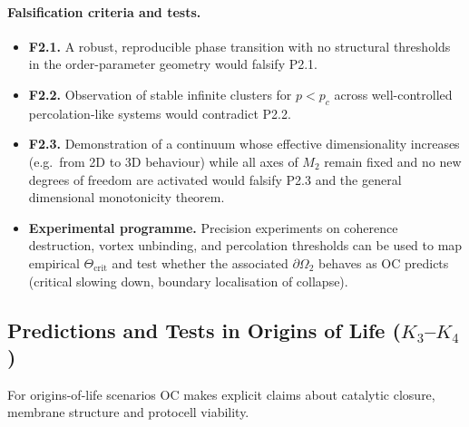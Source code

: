 \paragraph{Falsification criteria and tests.}
\begin{itemize}
  \item \textbf{F2.1.}
        A robust, reproducible phase transition with no structural
        thresholds in the order-parameter geometry would falsify P2.1.
  \item \textbf{F2.2.}
        Observation of stable infinite clusters for \(p<p_c\) across
        well-controlled percolation-like systems would contradict P2.2.
  \item \textbf{F2.3.}
        Demonstration of a continuum whose effective dimensionality increases
        (e.g.\ from 2D to 3D behaviour) while all axes of \(M_2\) remain
        fixed and no new degrees of freedom are activated would falsify
        P2.3 and the general dimensional monotonicity theorem.
  \item \textbf{Experimental programme.}
        Precision experiments on coherence destruction, vortex unbinding,
        and percolation thresholds can be used to map empirical
        \(\Theta_{\mathrm{crit}}\) and test whether the associated
        \(\partial\Omega_2\) behaves as OC predicts (critical slowing down,
        boundary localisation of collapse).
\end{itemize}

\subsection{Predictions and Tests in Origins of Life
            (\texorpdfstring{$K_3$}{K\_3}--\texorpdfstring{$K_4$}{K\_4})}

For origins-of-life scenarios OC makes explicit claims about catalytic
closure, membrane structure and protocell viability.


